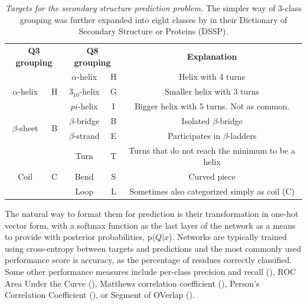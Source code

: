 	
	\begin{table}[h]
		\begin{tabular}{cc|cc|c}
		\multicolumn{2}{c}{\textbf{Q3 grouping}} & \multicolumn{2}{c}{\textbf{Q8 grouping}} &  \textbf{Explanation} \\ 
						&   & $\alpha$-helix & H & Helix with 4 turns \\ 
		$\alpha$-helix	& H & $3_{10}$-helix & G & Smaller helix with 3 turns \\ 
						&   & $pi$-helix 	 & I & Bigger helix with 5 turns. Not as common.\\ \hline
		\multirow{2}{*}{$\beta$-sheet}	& \multirow{2}{*}{B} & $\beta$-bridge & B & Isolated $\beta$-bridge \\ 
										&  					 & $\beta$-strand & E & Participates in $\beta$-ladders \\ \hline
				&   & Turn & T & Turns that do not reach the minimum to be a helix \\ 
		Coil	& C & Bend & S & Curved piece \\ 
				&   & Loop & L & Sometimes also categorized simply as coil (C)
		\end{tabular}
		\label{tab:q8}
		\caption{\textit{Targets for the secondary structure prediction problem.} The simpler way of 3-class grouping was further expanded into eight classes by \cite{Kabsch1983} in their Dictionary of Secondary Structure or Proteins (DSSP).}
	\end{table}
	
	The natural way to format them for prediction is their transformation in one-hot vector form, with a softmax function as the last layer of the network as a means to provide with posterior probabilities, p($Q|x$). Networks are typically trained using cross-entropy between targets and predictions and the most commonly used performance score is accuracy, as the percentage of residues correctly classified. Some other performance measures include per-class precision and recall (\cite{Wang2016}), ROC Area Under the Curve (\cite{Hattori2017}), Matthews correlation coefficient (\cite{Fang2017}), Person's Correlation Coefficient (\cite{Jurtz2017}), or Segment of OVerlap (\cite{Wang2016}).
	
